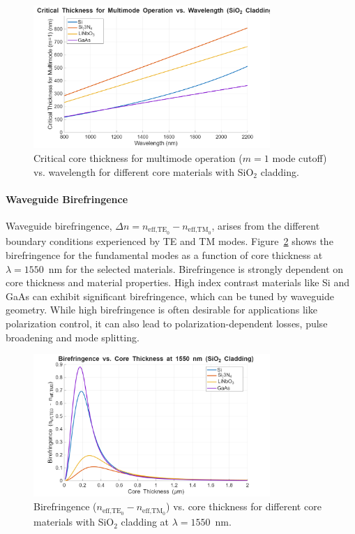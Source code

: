 \documentclass[10pt, a4paper]{article}
\begin{document}
\begin{figure}[h!]
    \centering
    \includegraphics[width=0.8\textwidth]{task1/critical_thickness_multimode_vs_wavelength_materials.png}
    \caption{Critical core thickness for multimode operation ($m=1$ mode cutoff) vs. wavelength for different core materials with SiO$_2$ cladding.}
    \label{fig:critical_thickness_multimode_vs_wavelength_materials}
\end{figure}

\paragraph{Waveguide Birefringence}
Waveguide birefringence, $\Delta n = n_{\text{eff,TE}_0} - n_{\text{eff,TM}_0}$, arises from the different boundary conditions experienced by TE and TM modes. Figure~\ref{fig:birefringence_vs_thickness_materials_1550nm} shows the birefringence for the fundamental modes as a function of core thickness at $\lambda = 1550$~nm for the selected materials. Birefringence is strongly dependent on core thickness and material properties. High index contrast materials like Si and GaAs can exhibit significant birefringence, which can be tuned by waveguide geometry. While high birefringence is often desirable for applications like polarization control, it can also lead to polarization-dependent losses, pulse broadening and mode splitting.

\begin{figure}[h!]
    \centering
    \includegraphics[width=0.8\textwidth]{task1/birefringence_vs_thickness_materials_1550nm.png}
    \caption{Birefringence ($n_{\text{eff,TE}_0} - n_{\text{eff,TM}_0}$) vs. core thickness for different core materials with SiO$_2$ cladding at $\lambda = 1550$~nm.}
    \label{fig:birefringence_vs_thickness_materials_1550nm}
\end{figure}
\end{document}
